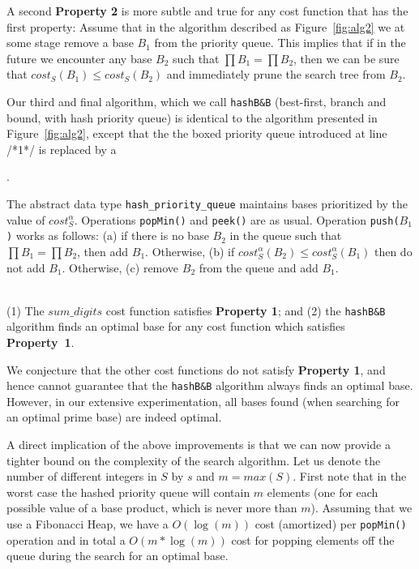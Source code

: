 \documentclass[envcountsame]{llncs}
\newcommand{\sumDigits}{\mathit{sum\_digits}}
\newcommand{\cost}{\mathit{cost}}
\begin{document}
A second \textbf{Property 2} is more subtle and true for any cost
function that has the first property: Assume that in the algorithm
described as Figure~\ref{fig:alg2} we at some stage remove a base
$B_1$ from the priority queue. This implies that if in the future we
encounter any base $B_2$ such that $\prod B_1 = \prod B_2$, then we
can be sure that $\cost_S(B_1) \leq \cost_S(B_2)$ and immediately
prune the search tree from $B_2$.

Our third and final algorithm, which we call \texttt{hashB\&B}
(best-first, branch and bound, with hash priority queue) is identical
to the algorithm presented in Figure~\ref{fig:alg2}, except that the
the boxed priority queue introduced at line {\scriptsize /*1*/} is
replaced by a \begin{tt}\end{tt}.

The abstract data type \texttt{hash\_priority\_queue} maintains bases
prioritized by the value of $\cost^\alpha_S$. Operations
\texttt{popMin()} and \texttt{peek()} are as usual. Operation
\texttt{push($B_1$)} works as follows: (a) if there is no base $B_2$
in the queue such that $\prod B_1=\prod B_2$, then add $B_1$.
Otherwise, (b) if $\cost^\alpha_S(B_2)\leq \cost^\alpha_S(B_1)$ then
do not add $B_1$. Otherwise, (c) remove $B_2$ from the queue and add
$B_1$.


\begin{theorem}\label{algIsGood}~\\
\noindent(1) The $\sumDigits$ cost function satisfies \textbf{Property 1}; and
(2)
the \texttt{hashB\&B} algorithm finds an optimal base for any cost
function which satisfies \textbf{Property~1}.
\end{theorem}

We conjecture that the other cost functions do not satisfy
\textbf{Property 1}, and hence cannot guarantee that the
\texttt{hashB\&B} algorithm always finds an optimal base.
However, in our extensive experimentation, all bases found
(when searching for an optimal prime base) are indeed optimal.





A direct implication of the above improvements is that we can now
provide a tighter bound on the complexity of the search algorithm.
Let us denote the number of different integers in $S$ by $s$ and
$m=max(S)$.
First note that in the worst case the hashed priority queue will
contain $m$ elements (one for each possible value of a base product,
which is never more than $m$).  
Assuming that we use a Fibonacci Heap, we have a $O(\log(m))$ cost
(amortized) per \texttt{popMin()} operation and in total a $O(m*
\log(m))$ cost for popping elements off the queue during the search
for an optimal base.
\end{document}
